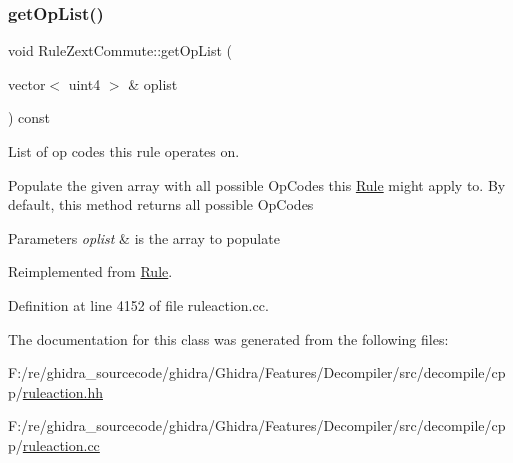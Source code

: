 \subsubsection{\texorpdfstring{getOpList()}{getOpList()}}
{\footnotesize\ttfamily void Rule\+Zext\+Commute\+::get\+Op\+List (\begin{DoxyParamCaption}\item[{vector$<$ uint4 $>$ \&}]{oplist }\end{DoxyParamCaption}) const\hspace{0.3cm}{\ttfamily [virtual]}}



List of op codes this rule operates on. 

Populate the given array with all possible Op\+Codes this \mbox{\hyperlink{class_rule}{Rule}} might apply to. By default, this method returns all possible Op\+Codes 
\begin{DoxyParams}{Parameters}
{\em oplist} & is the array to populate \\
\hline
\end{DoxyParams}


Reimplemented from \mbox{\hyperlink{class_rule_a4023bfc7825de0ab866790551856d10e}{Rule}}.



Definition at line 4152 of file ruleaction.\+cc.



The documentation for this class was generated from the following files\+:\begin{DoxyCompactItemize}
\item 
F\+:/re/ghidra\+\_\+sourcecode/ghidra/\+Ghidra/\+Features/\+Decompiler/src/decompile/cpp/\mbox{\hyperlink{ruleaction_8hh}{ruleaction.\+hh}}\item 
F\+:/re/ghidra\+\_\+sourcecode/ghidra/\+Ghidra/\+Features/\+Decompiler/src/decompile/cpp/\mbox{\hyperlink{ruleaction_8cc}{ruleaction.\+cc}}\end{DoxyCompactItemize}

